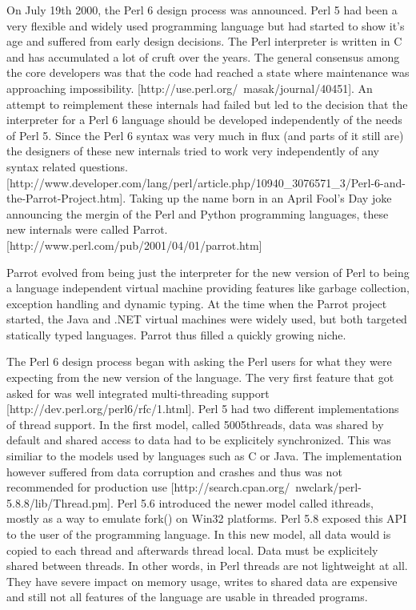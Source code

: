 \documentclass[bachelor,english]{hgbthesis}
\begin{document}
On July 19th 2000, the Perl 6 design process was announced. Perl 5 had been a very flexible and widely used programming language but had started to show it's age and suffered from early design decisions. The Perl interpreter is written in C and has accumulated a lot of cruft over the years. The general consensus among the core developers was that the code had reached a state where maintenance was approaching impossibility. [http://use.perl.org/~masak/journal/40451]. An attempt to reimplement these internals had failed but led to the decision that the interpreter for a Perl 6 language should be developed independently of the needs of Perl 5. Since the Perl 6 syntax was very much in flux (and parts of it still are) the designers of these new internals tried to work very independently of any syntax related questions. [http://www.developer.com/lang/perl/article.php/10940\_3076571\_3/Perl-6-and-the-Parrot-Project.htm]. Taking up the name born in an April Fool's Day joke announcing the mergin of the Perl and Python programming languages, these new internals were called Parrot. [http://www.perl.com/pub/2001/04/01/parrot.htm]

Parrot evolved from being just the interpreter for the new version of Perl to being a language independent virtual machine providing features like garbage collection, exception handling and dynamic typing. At the time when the Parrot project started, the Java and .NET virtual machines were widely used, but both targeted statically typed languages. Parrot thus filled a quickly growing niche.

The Perl 6 design process began with asking the Perl users for what they were expecting from the new version of the language. The very first feature that got asked for was well integrated multi-threading support [http://dev.perl.org/perl6/rfc/1.html]. Perl 5 had two different implementations of thread support. In the first model, called 5005threads, data was shared by default and shared access to data had to be explicitely synchronized. This was similiar to the models used by languages such as C or Java. The implementation however suffered from data corruption and crashes and thus was not recommended for production use [http://search.cpan.org/~nwclark/perl-5.8.8/lib/Thread.pm]. Perl 5.6 introduced the newer model called ithreads, mostly as a way to emulate fork() on Win32 platforms. Perl 5.8 exposed this API to the user of the programming language. In this new model, all data would is copied to each thread and afterwards thread local. Data must be explicitely shared between threads. In other words, in Perl threads are not lightweight at all. They have severe impact on memory usage, writes to shared data are expensive and still not all features of the language are usable in threaded programs.
\end{document}
